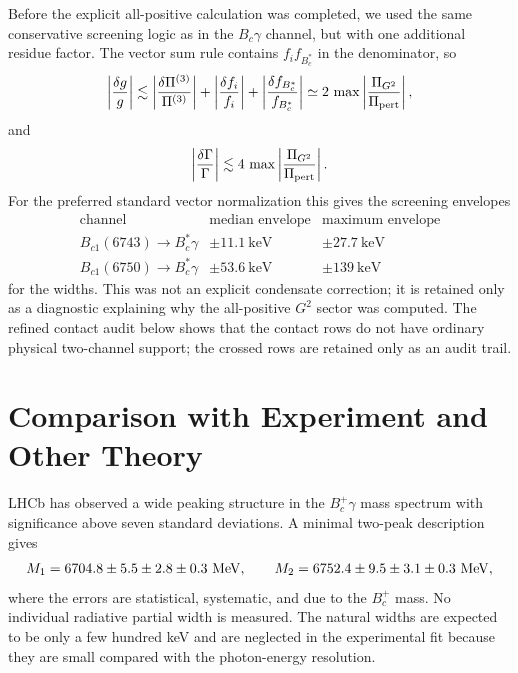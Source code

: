 \documentclass[11pt]{article}
\newcommand{\Bc}{B_c}
\newcommand{\Bcst}{B_c^\ast}
\newcommand{\BcOne}{B_{c1}}
\begin{document}
Before the explicit all-positive calculation was completed, we used the same
conservative screening logic as in the \(\Bc\gamma\) channel, but with one additional
residue factor.  The vector sum rule contains \(f_i f_{\Bcst}\) in the
denominator, so
\[
  \left|\frac{\delta g}{g}\right|
  \lesssim
  \left|\frac{\delta\Pi^{(3)}}{\Pi^{(3)}}\right|
  +
  \left|\frac{\delta f_i}{f_i}\right|
  +
  \left|\frac{\delta f_{\Bcst}}{f_{\Bcst}}\right|
  \simeq
  2\,\max\left|\frac{\Pi_{G^2}}{\Pi_{\rm pert}}\right|,
\]
and
\[
  \left|\frac{\delta\Gamma}{\Gamma}\right|
  \lesssim
  4\,\max\left|\frac{\Pi_{G^2}}{\Pi_{\rm pert}}\right|.
\]
For the preferred standard vector normalization this gives the screening
envelopes
\[
\begin{array}{c|cc}
\text{channel} & \text{median envelope} & \text{maximum envelope}\\
\hline
\BcOne(6743)\to\Bcst\gamma & \pm 11.1~\mathrm{keV} & \pm 27.7~\mathrm{keV}\\
\BcOne(6750)\to\Bcst\gamma & \pm 53.6~\mathrm{keV} & \pm 139~\mathrm{keV}
\end{array}
\]
for the widths.  This was not an explicit condensate correction; it is retained
only as a diagnostic explaining why the all-positive \(G^2\) sector was
computed.  The refined contact audit below shows that the contact rows do not
have ordinary physical two-channel support; the crossed rows are retained only
as an audit trail.

\section{Comparison with Experiment and Other Theory}

LHCb has observed a wide peaking structure in the \(\Bc^+\gamma\) mass
spectrum with significance above seven standard deviations.  A minimal
two-peak description gives~\cite{LHCbBc1PObservation2025,LHCbBc1PStudy2025}
\[
M_1=6704.8\pm5.5\pm2.8\pm0.3~{\rm MeV},\qquad
M_2=6752.4\pm9.5\pm3.1\pm0.3~{\rm MeV},
\]
where the errors are statistical, systematic, and due to the \(B_c^+\) mass.
No individual radiative partial width is measured.  The natural widths are
expected to be only a few hundred keV and are neglected in the experimental
fit because they are small compared with the photon-energy resolution.
\end{document}
